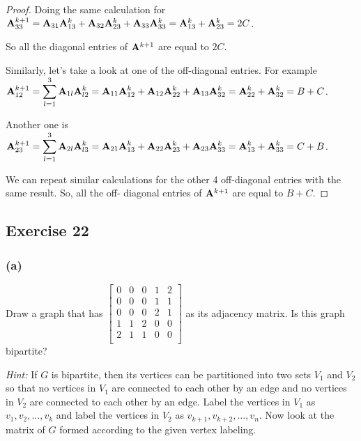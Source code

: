 \documentclass[14pt]{extarticle}
\newcommand{\dps}{\displaystyle}
\begin{document}
\begin{proof}
Doing the same calculation for \({\bf A}^{k+1}_{33} = {\bf A}_{31} {\bf A}^k_{13} + {\bf A}_{32} {\bf A}^k_{23} + {\bf A}
_{33} {\bf A}^k_{33} = {\bf A}^k_{13} + {\bf A}^k_{23} = 2C\).

So all the diagonal entries of \({\bf A}^{k+1}\) are equal to \(2C\).

Similarly, let's take a look at one of the off-diagonal entries. For example \(\dps {\bf A}^{k+1}_{12} = \sum_{l=1}^{3} {\bf A}_{1l} {\bf A}^k_{l2} = {\bf A}_{11} {\bf A}^k_{12} 
+ {\bf A}_{12} {\bf A}^k_{22} + {\bf A}_{13} {\bf A}^k_{32} = 
{\bf A}^k_{22} + {\bf A}^k_{32} = B + C\).

Another one is \(\dps {\bf A}^{k+1}_{23} = \sum_{l=1}^{3} {\bf A}_{2l} {\bf A}^k_{l3} = {\bf A}_{21} {\bf A}^k_{13} + {\bf A}_{22} {\bf A}^k_{23} + {\bf A}_{23} {\bf A}^k_{33} = {\bf A}^k_{13} + {\bf A}^k_{33} = C + B\).

We can repeat similar calculations for the other 4 off-diagonal entries with the same result. So, all the off-
diagonal entries of \({\bf A}^{k+1}\) are equal to \(B+C\).
\end{proof}

\subsection{Exercise 22}
\subsubsection{(a)}
Draw a graph that has
\(
\left[ 
\begin{array}{rrrrr}
0 & 0 & 0 & 1 & 2 \\
0 & 0 & 0 & 1 & 1 \\
0 & 0 & 0 & 2 & 1 \\
1 & 1 & 2 & 0 & 0 \\
2 & 1 & 1 & 0 & 0 \\
\end{array}
\right]
\)
as its adjacency matrix. Is this graph bipartite?

{\it Hint:} If \(G\) is bipartite, then its vertices can be partitioned into two sets \(V_1\) and \(V_2\) so that no 
vertices in \(V_1\) are connected to each other by an edge and no vertices in \(V_2\) are connected to each other by an edge. 
Label the vertices in \(V_1\) as \(v_1, v_2, \ldots, v_k\) and label the vertices in \(V_2\) as \(v_{k + 1}, v_{k + 2}, 
\ldots, v_n\). Now look at the matrix of \(G\) formed according to the given vertex labeling.
\end{document}
